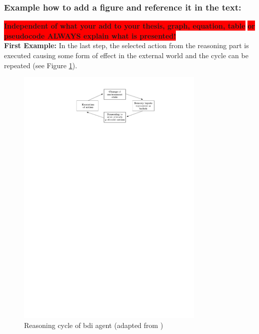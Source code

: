  
\subsubsection{Example how to add a figure and reference it in the text:}

\colorbox{red}{\textbf{Independent of what your add to your thesis, graph, equation, table}}
\colorbox{red}{\textbf{or pseudocode ALWAYS explain what is presented!}}
\\
 
\textbf{First Example:}
In the last step, the selected action from the reasoning part is executed causing some form of effect in the external world and the cycle can be repeated (see Figure \ref{reasoning}).

\begin{figure}[H]
	\centering
  \includegraphics[width=0.8\textwidth]{figures/reason_cycl.pdf}
	\caption{Reasoning cycle of \gls{bdi} agent (adapted from \cite{bremner2019})}
	\label{reasoning}
\end{figure} 


